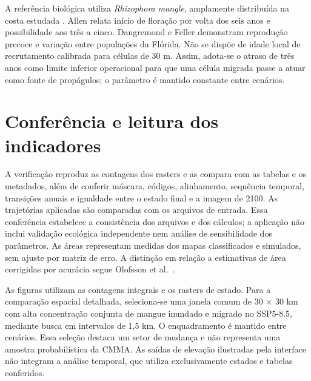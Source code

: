 \documentclass[12pt,a4paper]{article}
\begin{document}
A referência biológica utiliza \textit{Rhizophora mangle}, amplamente distribuída na costa estudada \citep{menezes2008}. Allen \citeyearpar{allen2002} relata início de floração por volta dos seis anos e possibilidade aos três a cinco. Dangremond e Feller \citeyearpar{dangremond2016} demonstram reprodução precoce e variação entre populações da Flórida. Não se dispõe de idade local de recrutamento calibrada para células de 30 m. Assim, adota-se o atraso de três anos como limite inferior operacional para que uma célula migrada passe a atuar como fonte de propágulos; o parâmetro é mantido constante entre cenários.

\section{Conferência e leitura dos indicadores}
A verificação reproduz as contagens dos rasters e as compara com as tabelas e os metadados, além de conferir máscara, códigos, alinhamento, sequência temporal, transições anuais e igualdade entre o estado final e a imagem de 2100. As trajetórias aplicadas são comparadas com os arquivos de entrada. Essa conferência estabelece a consistência dos arquivos e dos cálculos; a aplicação não inclui validação ecológica independente nem análise de sensibilidade dos parâmetros. As áreas representam medidas dos mapas classificados e simulados, sem ajuste por matriz de erro. A distinção em relação a estimativas de área corrigidas por acurácia segue Olofsson et al.\ \citeyearpar{olofsson2014}.

As figuras utilizam as contagens integrais e os rasters de estado. Para a comparação espacial detalhada, seleciona-se uma janela comum de 30 $\times$ 30 km com alta concentração conjunta de mangue inundado e migrado no SSP5-8.5, mediante busca em intervalos de 1,5 km. O enquadramento é mantido entre cenários. Essa seleção destaca um setor de mudança e não representa uma amostra probabilística da CMMA. As saídas de elevação ilustradas pela interface não integram a análise temporal, que utiliza exclusivamente estados e tabelas conferidos.
\end{document}
